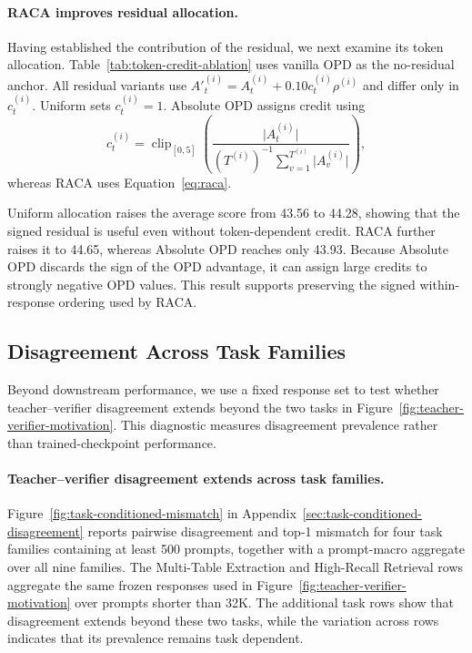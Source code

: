 

\paragraph{RACA improves residual allocation.}
Having established the contribution of the residual, we next examine its token allocation. Table~\ref{tab:token-credit-ablation} uses vanilla OPD as the no-residual anchor. All residual variants use $A'^{(i)}_t=A^{(i)}_t+0.10c^{(i)}_t\rho^{(i)}$ and differ only in $c^{(i)}_t$. Uniform sets $c^{(i)}_t=1$. Absolute OPD assigns credit using
\begin{equation}
c^{(i)}_t=\operatorname{clip}_{[0,5]}\!\left(
\frac{\lvert A^{(i)}_t\rvert}
{(T^{(i)})^{-1}\sum_{v=1}^{T^{(i)}}\lvert A^{(i)}_v\rvert}
\right),
\label{eq:absolute-opd-allocation}
\end{equation}
whereas RACA uses Equation~\ref{eq:raca}.

Uniform allocation raises the average score from 43.56 to 44.28, showing that the signed residual is useful even without token-dependent credit. RACA further raises it to 44.65, whereas Absolute OPD reaches only 43.93. Because Absolute OPD discards the sign of the OPD advantage, it can assign large credits to strongly negative OPD values. This result supports preserving the signed within-response ordering used by RACA.



\ifdefined\GCOPDSingleColumnLayout
\FloatBarrier
\fi

\subsection{Disagreement Across Task Families}

Beyond downstream performance, we use a fixed response set to test whether teacher--verifier disagreement extends beyond the two tasks in Figure~\ref{fig:teacher-verifier-motivation}. This diagnostic measures disagreement prevalence rather than trained-checkpoint performance.

\paragraph{Teacher--verifier disagreement extends across task families.}
Figure~\ref{fig:task-conditioned-mismatch} in Appendix~\ref{sec:task-conditioned-disagreement} reports pairwise disagreement and top-1 mismatch for four task families containing at least 500 prompts, together with a prompt-macro aggregate over all nine families. The Multi-Table Extraction and High-Recall Retrieval rows aggregate the same frozen responses used in Figure~\ref{fig:teacher-verifier-motivation} over prompts shorter than 32K. The additional task rows show that disagreement extends beyond these two tasks, while the variation across rows indicates that its prevalence remains task dependent.
